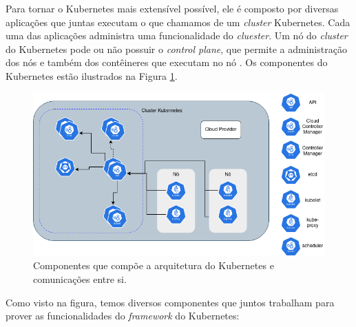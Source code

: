 Para tornar o Kubernetes mais extensível possível, ele é composto por diversas
aplicações que juntas executam o que chamamos de um \textit{cluster} Kubernetes.
Cada uma das aplicações administra uma funcionalidade do \textit{cluester}.
Um nó do \textit{cluster} do Kubernetes pode ou não possuir o \textit{control plane},
que permite a administração dos nós e também dos contêineres que executam no nó
\cite{kubernetes:components}. Os componentes do Kubernetes estão ilustrados na
Figura \ref{fig:kubernetes:components}.

\begin{figure}[h]
\centering
\includegraphics[scale=0.54]{images/kubernetes-components.png}
\caption{Componentes que compõe a arquitetura do Kubernetes e comunicações entre si.}
\label{fig:kubernetes:components}
\end{figure}

Como visto na figura, temos diversos componentes que juntos trabalham para
prover as funcionalidades do \textit{framework} do Kubernetes:

